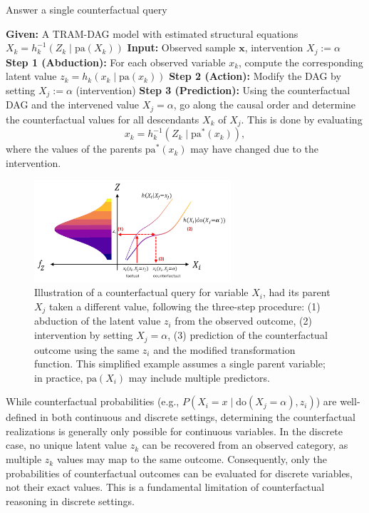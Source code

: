 \begin{algorithm}
\caption{Answer a single counterfactual query}
\label{alg:single_cf}
\begin{algorithmic}
\State \textbf{Given:} A TRAM-DAG model with estimated structural equations $X_k = h_k^{-1}(Z_k \mid \text{pa}(X_k))$
\State \textbf{Input:} Observed sample $\mathbf{x}$, intervention $X_j := \alpha$
\vspace{0.3em}
\State \textbf{Step 1 (Abduction):} For each observed variable $x_k$, compute the corresponding latent value $z_k = h_k(x_k \mid \text{pa}(x_k))$
\vspace{0.3em}
\State \textbf{Step 2 (Action):} Modify the DAG by setting $X_j := \alpha$ (intervention)
\vspace{0.3em}
\State \textbf{Step 3 (Prediction):} Using the counterfactual DAG and the intervened value $X_j = \alpha$, go along the causal order and determine the counterfactual values for all descendants $X_k$ of $X_j$. This is done by evaluating
\[
x_k = h_k^{-1}(Z_k \mid \text{pa}^*(x_k)),
\]
where the values of the parents $\text{pa}^*(x_k)$ may have changed due to the intervention.
\end{algorithmic}
\end{algorithm}

\begin{figure}[H]
\centering
\includegraphics[width=0.65\textwidth]{img/counterfactuals.png}
\caption{Illustration of a counterfactual query for variable $X_i$, had its parent $X_j$ taken a different value, following the three-step procedure: (1) abduction of the latent value $z_i$ from the observed outcome, (2) intervention by setting $X_j = \alpha$, (3) prediction of the counterfactual outcome using the same $z_i$ and the modified transformation function. This simplified example assumes a single parent variable; in practice, $\text{pa}(X_i)$ may include multiple predictors.}
\label{fig:cf_viz}
\end{figure}



While counterfactual probabilities (e.g., $P(X_i = x \mid \text{do}(X_j = \alpha), z_i)$) are well-defined in both continuous and discrete settings, determining the counterfactual realizations is generally only possible for continuous variables. In the discrete case, no unique latent value $z_k$ can be recovered from an observed category, as multiple $z_k$ values may map to the same outcome. Consequently, only the probabilities of counterfactual outcomes can be evaluated for discrete variables, not their exact values. This is a fundamental limitation of counterfactual reasoning in discrete settings.

